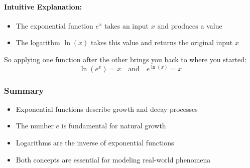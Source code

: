 \paragraph{Intuitive Explanation:}
\begin{itemize}
    \item The exponential function $e^x$ takes an input $x$ and produces a value
    \item The logarithm $\ln(x)$ takes this value and returns the original input $x$
\end{itemize}

So applying one function after the other brings you back to where you started:
\begin{equation}
    \ln(e^x) = x \quad \text{and} \quad e^{\ln(x)} = x
\end{equation}

\subsubsection{Summary}

\begin{itemize}
    \item Exponential functions describe growth and decay processes
    \item The number $e$ is fundamental for natural growth
    \item Logarithms are the inverse of exponential functions
    \item Both concepts are essential for modeling real-world phenomena
\end{itemize}


